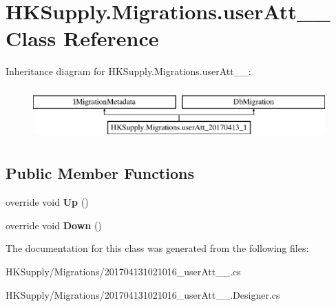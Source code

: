 \hypertarget{class_h_k_supply_1_1_migrations_1_1user_att__20170413__1}{}\section{H\+K\+Supply.\+Migrations.\+user\+Att\+\_\+\_ Class Reference}
\label{class_h_k_supply_1_1_migrations_1_1user_att__20170413__1}
Inheritance diagram for H\+K\+Supply.\+Migrations.\+user\+Att\+\_\+\_\+:\begin{figure}[H]
\begin{center}
\leavevmode
\includegraphics[height=2.000000cm]{class_h_k_supply_1_1_migrations_1_1user_att__20170413__1}
\end{center}
\end{figure}
\subsection*{Public Member Functions}
\begin{DoxyCompactItemize}
\item 
\mbox{\label{class_h_k_supply_1_1_migrations_1_1user_att__20170413__1_aed4ad7a3e42dbb0baf041370f7e0055d}} 
override void {\bfseries Up} ()
\item 
\mbox{\label{class_h_k_supply_1_1_migrations_1_1user_att__20170413__1_a83dcc2491c7d6bcb1aad089d0f5a0ce9}} 
override void {\bfseries Down} ()
\end{DoxyCompactItemize}


The documentation for this class was generated from the following files\+:\begin{DoxyCompactItemize}
\item 
H\+K\+Supply/\+Migrations/201704131021016\+\_\+user\+Att\+\_\+\_.\+cs\item 
H\+K\+Supply/\+Migrations/201704131021016\+\_\+user\+Att\+\_\+\_.\+Designer.\+cs\end{DoxyCompactItemize}

